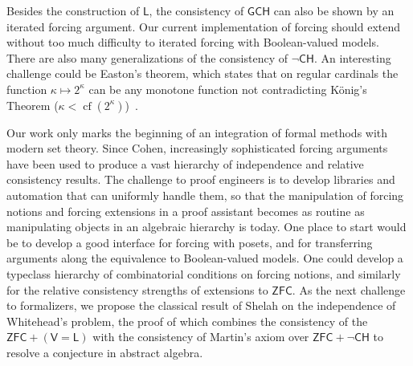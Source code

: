 \documentclass[sigplan,10pt,review]{acmart}
\newcommand{\ZFC}{\mathsf{ZFC}}
\newcommand{\CH}{\mathsf{CH}}
\theoremstyle{definition}
\DeclareMathOperator{\cf}{cf}
\begin{document}

Besides the construction of \(\mathsf{L}\), the consistency of $\mathsf{GCH}$ can also be shown by an iterated forcing argument. Our current implementation of forcing should extend without too much difficulty to iterated forcing with Boolean-valued models. There are also many generalizations of the consistency of $\neg \mathsf{CH}$.
An interesting challenge could be Easton's theorem, which states that on regular cardinals the function $\kappa\mapsto 2^\kappa$ can be any monotone function not contradicting K\"onig's Theorem ($\kappa<\cf(2^\kappa)$)~\cite{easton1970powers}.

Our work only marks the beginning of an integration of formal methods with modern set theory. Since Cohen, increasingly sophisticated forcing arguments have been used to produce a vast hierarchy of independence and relative consistency results. The challenge to proof engineers is to develop libraries and automation that can uniformly handle them, so that the manipulation of forcing notions and forcing extensions in a proof assistant becomes as routine as manipulating objects in an algebraic hierarchy is today. One place to start would be to develop a good interface for forcing with posets, and for transferring arguments along the equivalence to Boolean-valued models. One could develop a typeclass hierarchy of combinatorial conditions on forcing notions, and similarly for the relative consistency strengths of extensions to \(\ZFC\).
As the next challenge to formalizers, we propose the classical result of Shelah \cite{shelah1974infinite} on the independence of Whitehead's problem, the proof of which combines the consistency of the \(\mathsf{ZFC} + (\mathsf{V} = \mathsf{L})\) with the consistency of Martin's axiom \cite{martin1970internal} over \(\ZFC + \neg \CH\) to resolve a conjecture in abstract algebra.

\end{document}

